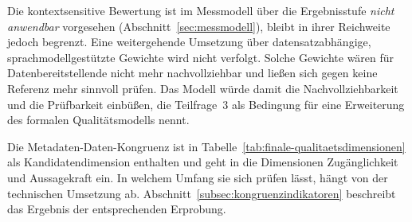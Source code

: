 Die kontextsensitive Bewertung ist im Messmodell über die Ergebnisstufe \emph{nicht anwendbar} vorgesehen (Abschnitt~\ref{sec:messmodell}), bleibt in ihrer Reichweite jedoch begrenzt. Eine weitergehende Umsetzung über datensatzabhängige, sprachmodellgestützte Gewichte wird nicht verfolgt. Solche Gewichte wären für Datenbereitstellende nicht mehr nachvollziehbar und ließen sich gegen keine Referenz mehr sinnvoll prüfen. Das Modell würde damit die Nachvollziehbarkeit und die Prüfbarkeit einbüßen, die Teilfrage~3 als Bedingung für eine Erweiterung des formalen Qualitätsmodells nennt.

Die Metadaten-Daten-Kongruenz ist in Tabelle~\ref{tab:finale-qualitaetsdimensionen} als Kandidatendimension enthalten und geht in die Dimensionen Zugänglichkeit und Aussagekraft ein. In welchem Umfang sie sich prüfen lässt, hängt von der technischen Umsetzung ab. Abschnitt~\ref{subsec:kongruenzindikatoren} beschreibt das Ergebnis der entsprechenden Erprobung.






